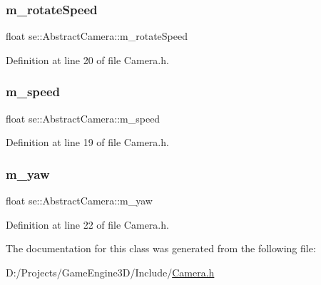 \subsubsection{\texorpdfstring{m\+\_\+rotate\+Speed}{m\_rotateSpeed}}
{\footnotesize\ttfamily float se\+::\+Abstract\+Camera\+::m\+\_\+rotate\+Speed\hspace{0.3cm}{\ttfamily [protected]}}



Definition at line 20 of file Camera.\+h.

\mbox{\label{classse_1_1_abstract_camera_a4689e12e2d96c8243ea8790301ed30a7}} 
\subsubsection{\texorpdfstring{m\+\_\+speed}{m\_speed}}
{\footnotesize\ttfamily float se\+::\+Abstract\+Camera\+::m\+\_\+speed\hspace{0.3cm}{\ttfamily [protected]}}



Definition at line 19 of file Camera.\+h.

\mbox{\label{classse_1_1_abstract_camera_ae3b2898fd2db420ac4329c13e96a98db}} 
\subsubsection{\texorpdfstring{m\+\_\+yaw}{m\_yaw}}
{\footnotesize\ttfamily float se\+::\+Abstract\+Camera\+::m\+\_\+yaw\hspace{0.3cm}{\ttfamily [protected]}}



Definition at line 22 of file Camera.\+h.



The documentation for this class was generated from the following file\+:\begin{DoxyCompactItemize}
\item 
D\+:/\+Projects/\+Game\+Engine3\+D/\+Include/\mbox{\hyperlink{_camera_8h}{Camera.\+h}}\end{DoxyCompactItemize}
